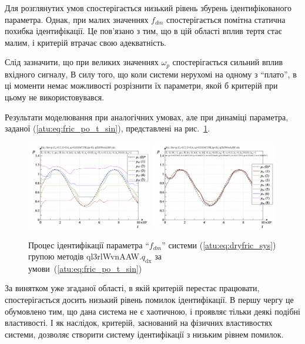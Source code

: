 Для розглянутих умов спостерігається низький рівень збурень
ідентифікованого параметра. Однак, при малих значеннях
$ f_{dm} $ спостерігається помітна статична похибка
ідентифікації. Це пов'язано з тим, що в цій області вплив тертя
стає малим, і критерій втрачає свою адекватність.

Слід зазначити, що при великих значеннях
$ \omega_p $ спостерігається сильний вплив вхідного сигналу, В силу
того, що коли системи нерухомі на одному з ``плато'', в ці моменти
немає можливості розрізнити їх параметри, якой б критерій при
цьому не використовувався.

Результати моделювання при аналогічних умовах, але при
динаміці параметра, заданої (\ref{atu:eq:fric_po_t_sin}), представлені на
рис.~\ref{atu:f:fric_id_ql3rlWvnAAW_q_dx_sin}.

\begin{figure}[htb!]
  \centerline{
    \includegraphics[width=0.49\textwidth]{p/cha/fric/ql3rlWvnAAW/fric_id-p_t_pi_ql3rlWvnAAW_sin.png}
    \hfill
    \includegraphics[width=0.49\textwidth]{p/cha/fric/ql3rlWvnAAW/fric_id-p_t_p_ql3rlWvnAAW_sin.png}
  }
\caption{Процес ідентифікації параметра ``$f_{dm}$'' системи (\ref{atu:eq:dryfric_sys}) групою методів ql3rlWvnAAW.$q_\mathrm{dx}$ за умови~(\ref{atu:eq:fric_po_t_sin})}
\label{atu:f:fric_id_ql3rlWvnAAW_q_dx_sin}
\end{figure}

За винятком уже згаданої області, в якій критерій перестає
працювати, спостерігається досить низький рівень помилок
ідентифікації. В першу чергу це обумовлено тим, що дана система
не є хаотичною, і проявляє тільки деякі подібні властивості. І
як наслідок, критерій, заснований на фізичних властивостях
системи, дозволяє створити систему ідентифікації з низьким
рівнем помилок.


